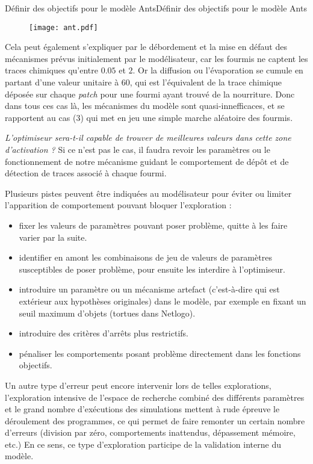 \begin{testiv}{Définir des objectifs pour le modèle Ants}{Définir des objectifs pour le modèle Ants}
\begin{figure}[H]
	 \centering
	 	\texttt{[image: ant.pdf]}
\end{figure}

Cela peut également s'expliquer par le débordement et la mise en défaut des mécanismes prévus initialement par le modélisateur, car les fourmis ne captent les traces chimiques qu'entre $0.05$ et $2$. Or la diffusion ou l'évaporation se cumule en partant d'une valeur unitaire à $60$, qui est l'équivalent de la trace chimique déposée sur chaque \textit{patch} pour une fourmi ayant trouvé de la nourriture. Donc dans tous ces cas là, les mécanismes du modèle sont quasi-innefficaces, et se rapportent au cas (3) qui met en jeu une simple marche aléatoire des fourmis.

\textit{L'optimiseur sera-t-il capable de trouver de meilleures valeurs dans cette zone d'activation ?} Si ce n'est pas le cas, il faudra revoir les paramètres ou le fonctionnement de notre mécanisme guidant le comportement de dépôt et de détection de traces associé à chaque fourmi.

Plusieurs pistes peuvent être indiquées au modélisateur pour éviter ou limiter l'apparition de comportement pouvant bloquer l'exploration :

\begin{itemize}[noitemsep,nolistsep]
	\item fixer les valeurs de paramètres pouvant poser problème, quitte à les faire varier par la suite.
	\item identifier en amont les combinaisons de jeu de valeurs de paramètres susceptibles de poser problème, pour ensuite les interdire à l'optimiseur.
	\item introduire un paramètre ou un mécanisme artefact (c'est-à-dire qui est extérieur aux hypothèses originales) dans le modèle, par exemple en fixant un seuil maximum d'objets (tortues dans Netlogo).
	\item introduire des critères d'arrêts plus restrictifs.
	\item pénaliser les comportements posant problème directement dans les fonctions objectifs.
\end{itemize}

Un autre type d'erreur peut encore intervenir lors de telles explorations, l'exploration intensive de l'espace de recherche combiné des différents paramètres et le grand nombre d'exécutions des simulations mettent à rude épreuve le déroulement des programmes, ce qui permet de faire remonter un certain nombre d'erreurs (division par zéro, comportements inattendus, dépassement mémoire, etc.) En ce sens, ce type d'exploration participe de la validation interne du modèle.

\end{testiv}


